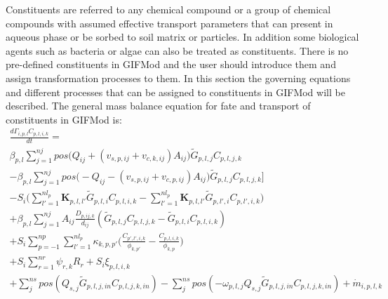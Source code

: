 Constituents are referred to any chemical compound or a group of chemical compounds with assumed effective transport parameters that can present in aqueous phase or be sorbed to soil matrix or particles. In addition some biological agents such as bacteria or algae can also be treated as constituents. There is no pre-defined constituents in GIFMod and the user should introduce them and assign transformation processes to them. In this section the governing equations and different processes that can be assigned to constituents in GIFMod will be described. The general mass balance equation for fate and transport of constituents in GIFMod is:
\begin{equation}
\label{eq:26}
\begin{split}
\frac{d\Gamma_{i,p,l} C_{p,l,i,k}}{dt} =\\ \beta_{p,l} \sum_{j=1}^{nj} pos \big(Q_{ij}+(v_{s,p,ij}+v_{c,k,ij})A_{ij}\big)\tilde G_{p,l,j}C_{p,l,j,k} \\ -\beta_{p,l} \sum_{j=1}^{nj} pos \big(-Q_{ij}-(v_{s,p,ij}+v_{c,p,ij})A_{ij}\big)\tilde G_{p,l,j}C_{p,l,j,k}\bigg]\\
-S_i \big(\sum_{l'=1}^{nl_p}\textbf{K}_{p,l,l'}\tilde G_{p,l,i}C_{p,l,i,k}-\sum_{l'=1}^{nl_p}\textbf{K}_{p,l,l'}\tilde G_{p,l',i}C_{p,l',i,k}\big)\\
+ \beta_{p,l} \sum_{j=1}^{nj} A_{ij}\frac{D_{p,ij,k}}{d_{ij}}(\tilde G_{p,l,j}C_{p,l,j,k}-\tilde G_{p,l,i}C_{p,l,i,k}) \\
+ S_i \sum_{p=-1}^{np} \sum_{l'=1}^{nl_p}\kappa_{k,p,p'}\bigg(\frac{C_{p',l',i,k}}{\phi_{k,p'}}-\frac{C_{p,l,i,k}}{\phi_{k,p}}\bigg)  \\ +S_i \sum_{r=1}^{nr} \psi_{r,k}R_r + S_i \xi_{p,l,i,k} \\
+ \sum_j^{ns} pos(Q_{s,j} \tilde G_{p,l,j,in} C_{p,l,j,k,in}) - \sum_j^{ns} pos(-\omega_{p,l,j} Q_{s,j} \tilde G_{p,l,j,in} C_{p,l,j,k,in}) + \dot{m}_{i,p,l,k}
\end{split}
\end{equation}
